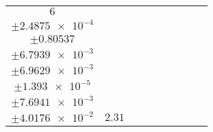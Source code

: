\documentclass[8pt]{article}
\begin{document}
\begin{longtable}[l]{c c c c c c c c c}
$\num{6}$ & \begin{tabular}[c]{@{}c@{}}$\num{3.3203e-2}$ \\ $\pm\num{2.4875e-4}$\end{tabular} & \begin{tabular}[c]{@{}c@{}}$\num{1.3906}$ \\ $\pm\num{0.80537}$\end{tabular} & \begin{tabular}[c]{@{}c@{}}$\num{7.4489}$ \\ $\pm\num{6.7939e-3}$\end{tabular} & \begin{tabular}[c]{@{}c@{}}$\num{2.9642e+3}$ \\ $\pm\num{6.9629e-3}$\end{tabular} & \begin{tabular}[c]{@{}c@{}}$\num{5.9299}$ \\ $\pm\num{1.393e-5}$\end{tabular} & \begin{tabular}[c]{@{}c@{}}$\num{2.6512}$ \\ $\pm\num{7.6941e-3}$\end{tabular} & \begin{tabular}[c]{@{}c@{}}$\num{3.8924}$ \\ $\pm\num{4.0176e-2}$\end{tabular} & $\num{2.31}$\\
\bottomrule
\end{longtable}
\end{document}

